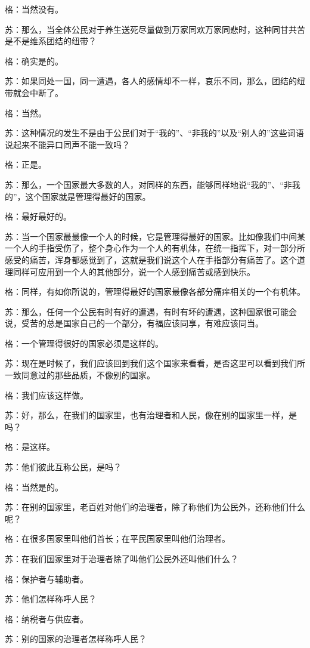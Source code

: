 \documentclass[12pt,oneside]{book}
\begin{document}
格：当然没有。

苏：那么，当全体公民对于养生送死尽量做到万家同欢万家同悲时，这种同甘共苦是不是维系团结的纽带？

格：确实是的。

苏：如果同处一国，同一遭遇，各人的感情却不一样，哀乐不同，那么，团结的纽带就会中断了。

格：当然。

苏：这种情况的发生不是由于公民们对于“我的”、“非我的”以及“别人的”这些词语说起来不能异口同声不能一致吗？

格：正是。

苏：那么，一个国家最大多数的人，对同样的东西，能够同样地说“我的”、“非我的”，这个国家就是管理得最好的国家。

格：最好最好的。

苏：当一个国家最最像一个人的时候，它是管理得最好的国家。比如像我们中间某一个人的手指受伤了，整个身心作为一个人的有机体，在统一指挥下，对一部分所感受的痛苦，浑身都感觉到了，这就是我们说这个人在手指部分有痛苦了。这个道理同样可应用到一个人的其他部分，说一个人感到痛苦或感到快乐。

格：同样，有如你所说的，管理得最好的国家最像各部分痛痒相关的一个有机体。

苏：那么，任何一个公民有时有好的遭遇，有时有坏的遭遇，这种国家很可能会说，受苦的总是国家自己的一个部分，有福应该同享，有难应该同当。

格：一个管理得很好的国家必须是这样的。

苏：现在是时候了，我们应该回到我们这个国家来看看，是否这里可以看到我们所一致同意过的那些品质，不像别的国家。

格：我们应该这样做。

苏：好，那么，在我们的国家里，也有治理者和人民，像在别的国家里一样，是吗？

格：是这样。

苏：他们彼此互称公民，是吗？

格：当然是的。

苏：在别的国家里，老百姓对他们的治理者，除了称他们为公民外，还称他们什么呢？

格：在很多国家里叫他们首长；在平民国家里叫他们治理者。

苏：在我们国家里对于治理者除了叫他们公民外还叫他们什么？

格：保护者与辅助者。

苏：他们怎样称呼人民？

格：纳税者与供应者。

苏：别的国家的治理者怎样称呼人民？
\end{document}
